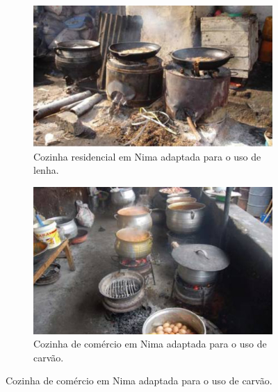 \begin{frame}
  \frametitle{}
  \begin{figure}[H]
    \centering
    \begin{subfigure}[b]{0.4\linewidth}
      \includegraphics[width=\linewidth]{../../inputs/images/zheng/arku1.jpeg}
      \caption{Cozinha residencial em Nima adaptada para o uso de lenha.}
    \end{subfigure}%
    \hspace{0.5cm}
    \begin{subfigure}[b]{0.4\linewidth}
      \includegraphics[width=\linewidth]{../../inputs/images/zheng/arku2.jpeg}
      \caption{Cozinha de comércio em Nima adaptada para o uso de carvão.}
    \end{subfigure}
  \end{figure}
\end{frame}
